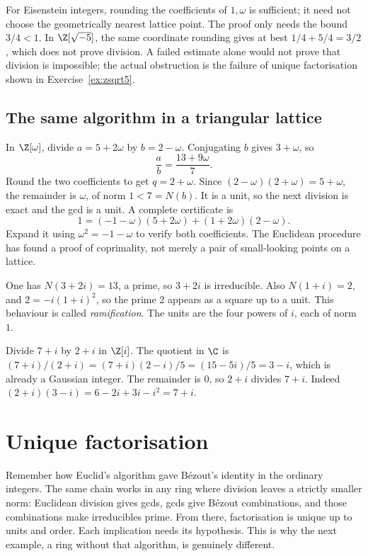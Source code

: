 For Eisenstein integers, rounding the coefficients of $1,\omega$ is sufficient;
it need not choose the geometrically nearest lattice point. The proof only
needs the bound $3/4<1$. In $\Z[\sqrt{-5}]$, the same coordinate rounding gives
at best $1/4+5/4=3/2$, which does not prove division. A failed estimate alone
would not prove that division is impossible; the actual obstruction is the
failure of unique factorisation shown in Exercise~\ref{ex:zsqrt5}.

\subsection*{The same algorithm in a triangular lattice}
In $\Z[\omega]$, divide $a=5+2\omega$ by $b=2-\omega$.
Conjugating $b$ gives $3+\omega$, so
\[
\frac ab=\frac{13+9\omega}{7}.
\]
Round the two coefficients to get $q=2+\omega$. Since
$(2-\omega)(2+\omega)=5+\omega$, the remainder is $\omega$,
of norm $1<7=N(b)$. It is a unit, so the next division is exact
and the gcd is a unit. A complete certificate is
\[
1=(-1-\omega)(5+2\omega)+(1+2\omega)(2-\omega).
\]
Expand it using $\omega^2=-1-\omega$ to verify both coefficients.
The Euclidean procedure has found a proof of coprimality, not merely
a pair of small-looking points on a lattice.

\begin{examplex}
One has $N(3+2i)=13$, a prime, so $3+2i$ is irreducible. Also $N(1+i)=2$, and $2=-i(1+i)^2$, so the prime $2$ appears as a square up to a unit. This behaviour is called \emph{ramification}. The units are the four powers of $i$, each of norm $1$.
\end{examplex}

\begin{examplex}
Divide $7+i$ by $2+i$ in $\Z[i]$. The quotient in $\C$ is $(7+i)/(2+i)=(7+i)(2-i)/5=(15-5i)/5=3-i$, which is already a Gaussian integer. The remainder is $0$, so $2+i$ divides $7+i$. Indeed $(2+i)(3-i)=6-2i+3i-i^2=7+i$.
\end{examplex}

\section{Unique factorisation}

Remember how Euclid's algorithm gave B\'ezout's identity in the ordinary integers. The same chain works in any ring where division leaves a strictly smaller norm: Euclidean division gives gcds, gcds give B\'ezout combinations, and those combinations make irreducibles prime. From there, factorisation is unique up to units and order. Each implication needs its hypothesis. This is why the next example, a ring without that algorithm, is genuinely different.

